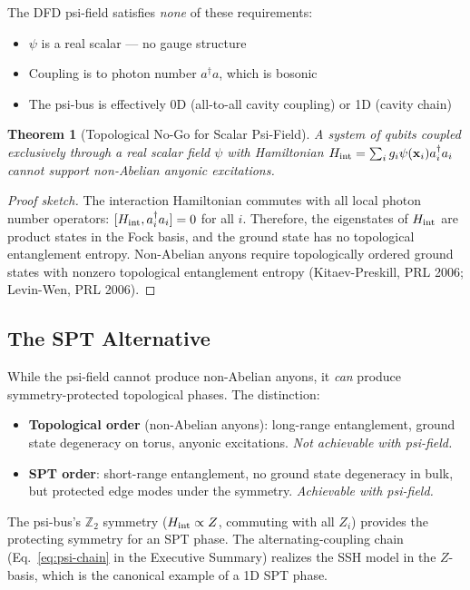 \documentclass[11pt]{article}
\newtheorem{theorem}{Theorem}[section]
\theoremstyle{definition}
\theoremstyle{remark}
\begin{document}
The DFD psi-field satisfies \emph{none} of these requirements:
\begin{itemize}[nosep]
  \item $\psi$ is a real scalar --- no gauge structure
  \item Coupling is to photon number $a^\dagger a$, which is bosonic
  \item The psi-bus is effectively 0D (all-to-all cavity coupling)
    or 1D (cavity chain)
\end{itemize}

\begin{theorem}[Topological No-Go for Scalar Psi-Field]
\label{thm:topo-nogo}
A system of qubits coupled exclusively through a real scalar field
$\psi$ with Hamiltonian $H_{\rm int} = \sum_i g_i \psi(\mathbf{x}_i)
a_i^\dagger a_i$ cannot support non-Abelian anyonic excitations.
\end{theorem}

\begin{proof}[Proof sketch]
The interaction Hamiltonian commutes with all local photon number operators:
$[H_{\rm int}, a_i^\dagger a_i] = 0$ for all $i$.  Therefore, the
eigenstates of $H_{\rm int}$ are product states in the Fock basis,
and the ground state has no topological entanglement entropy.  Non-Abelian
anyons require topologically ordered ground states with nonzero topological
entanglement entropy (Kitaev-Preskill, PRL 2006; Levin-Wen, PRL 2006).
\end{proof}

\subsection{The SPT Alternative}
\label{sec:spt-alternative}

While the psi-field cannot produce non-Abelian anyons, it \emph{can}
produce symmetry-protected topological phases.  The distinction:
\begin{itemize}[nosep]
  \item \textbf{Topological order} (non-Abelian anyons): long-range
    entanglement, ground state degeneracy on torus, anyonic excitations.
    \emph{Not achievable with psi-field.}
  \item \textbf{SPT order}: short-range entanglement, no ground state
    degeneracy in bulk, but protected edge modes under the symmetry.
    \emph{Achievable with psi-field.}
\end{itemize}

The psi-bus's $\mathbb{Z}_2$ symmetry ($H_{\rm int} \propto Z$, commuting
with all $Z_i$) provides the protecting symmetry for an SPT phase.
The alternating-coupling chain (Eq.~\eqref{eq:psi-chain} in the
Executive Summary) realizes the SSH model in the $Z$-basis, which is
the canonical example of a 1D SPT phase.
\end{document}
